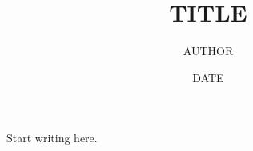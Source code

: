 \documentclass[11pt]{article}
\title{{{TITLE}}}
\author{{{AUTHOR}}}
\date{{{DATE}}}
\begin{document}
\maketitle

Start writing here.
\end{document}
